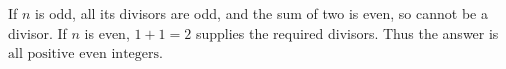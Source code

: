 If $n$ is odd, all its divisors are odd, and the sum of two is even, so cannot be a divisor. If $n$ is even, $1+1=2$ supplies the required divisors. Thus the answer is $\boxed{\text{all positive even integers}}$.
